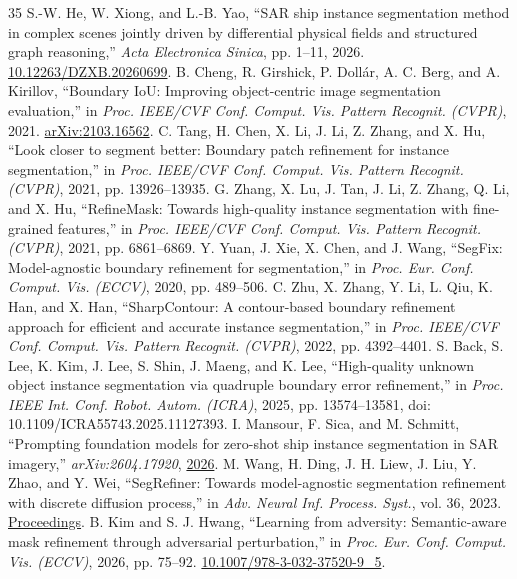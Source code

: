 \documentclass[journal]{IEEEtran}
\begin{document}
\begin{thebibliography}{35}
 S.-W. He, W. Xiong, and L.-B. Yao, ``SAR ship instance segmentation method in complex scenes jointly driven by differential physical fields and structured graph reasoning,'' \emph{Acta Electronica Sinica}, pp. 1--11, 2026. \href{https://doi.org/10.12263/DZXB.20260699}{10.12263/DZXB.20260699}.
 B. Cheng, R. Girshick, P. Doll{\'a}r, A. C. Berg, and A. Kirillov, ``Boundary IoU: Improving object-centric image segmentation evaluation,'' in \emph{Proc. IEEE/CVF Conf. Comput. Vis. Pattern Recognit. (CVPR)}, 2021. \href{https://arxiv.org/abs/2103.16562}{arXiv:2103.16562}.
 C. Tang, H. Chen, X. Li, J. Li, Z. Zhang, and X. Hu, ``Look closer to segment better: Boundary patch refinement for instance segmentation,'' in \emph{Proc. IEEE/CVF Conf. Comput. Vis. Pattern Recognit. (CVPR)}, 2021, pp. 13926--13935.
 G. Zhang, X. Lu, J. Tan, J. Li, Z. Zhang, Q. Li, and X. Hu, ``RefineMask: Towards high-quality instance segmentation with fine-grained features,'' in \emph{Proc. IEEE/CVF Conf. Comput. Vis. Pattern Recognit. (CVPR)}, 2021, pp. 6861--6869.
 Y. Yuan, J. Xie, X. Chen, and J. Wang, ``SegFix: Model-agnostic boundary refinement for segmentation,'' in \emph{Proc. Eur. Conf. Comput. Vis. (ECCV)}, 2020, pp. 489--506.
 C. Zhu, X. Zhang, Y. Li, L. Qiu, K. Han, and X. Han, ``SharpContour: A contour-based boundary refinement approach for efficient and accurate instance segmentation,'' in \emph{Proc. IEEE/CVF Conf. Comput. Vis. Pattern Recognit. (CVPR)}, 2022, pp. 4392--4401.
 S. Back, S. Lee, K. Kim, J. Lee, S. Shin, J. Maeng, and K. Lee, ``High-quality unknown object instance segmentation via quadruple boundary error refinement,'' in \emph{Proc. IEEE Int. Conf. Robot. Autom. (ICRA)}, 2025, pp. 13574--13581, doi: 10.1109/ICRA55743.2025.11127393.
 I. Mansour, F. Sica, and M. Schmitt, ``Prompting foundation models for zero-shot ship instance segmentation in SAR imagery,'' \emph{arXiv:2604.17920}, \href{https://arxiv.org/abs/2604.17920}{2026}.
 M. Wang, H. Ding, J. H. Liew, J. Liu, Y. Zhao, and Y. Wei, ``SegRefiner: Towards model-agnostic segmentation refinement with discrete diffusion process,'' in \emph{Adv. Neural Inf. Process. Syst.}, vol. 36, 2023. \href{https://proceedings.neurips.cc/paper_files/paper/2023/hash/fc0cc55dca3d791c4a0bb2d8ddeefe4f-Abstract-Conference.html}{Proceedings}.
 B. Kim and S. J. Hwang, ``Learning from adversity: Semantic-aware mask refinement through adversarial perturbation,'' in \emph{Proc. Eur. Conf. Comput. Vis. (ECCV)}, 2026, pp. 75--92. \href{https://doi.org/10.1007/978-3-032-37520-9_5}{10.1007/978-3-032-37520-9\_5}.

\end{thebibliography}
\end{document}
